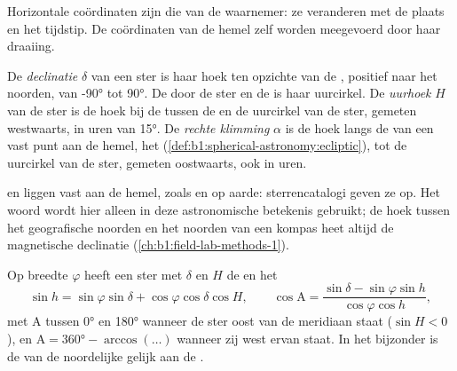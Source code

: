 Horizontale coördinaten zijn die van de waarnemer: ze veranderen met de plaats
en het tijdstip. De coördinaten van de hemel zelf worden meegevoerd door haar
draaiing.

\begin{definition}\label{def:b1:spherical-astronomy:equatorial}
De \emph{declinatie} $\delta$ van een ster is haar
hoek ten opzichte van de , positief naar het noorden, van \ang{-90}
tot \ang{90}. De  door de ster en de  is haar
uurcirkel. De \emph{uurhoek} $H$ van de ster is de hoek bij de
 tussen de  en de uurcirkel van de ster, gemeten
westwaarts, in uren van \ang{15}. De \emph{rechte klimming}
$\alpha$ is de hoek langs de  van een vast punt aan de hemel, het
 (\cref{def:b1:spherical-astronomy:ecliptic}), tot de uurcirkel van de
ster, gemeten oostwaarts, ook in uren.
\end{definition}

 en  liggen vast aan de hemel, zoals  en
 op aarde: sterrencatalogi geven ze op. Het woord  wordt
hier alleen in deze astronomische betekenis gebruikt; de hoek tussen het
geografische noorden en het noorden van een kompas heet altijd de
magnetische declinatie (\cref{ch:b1:field-lab-methods-1}).

\begin{proposition}\label{prop:b1:spherical-astronomy:transform}
Op breedte $\varphi$ heeft een ster met  $\delta$ en  $H$ de
 en het 
\[
  \sin h = \sin\varphi\sin\delta + \cos\varphi\cos\delta\cos H,
  \qquad
  \cos\mathrm{A} = \frac{\sin\delta - \sin\varphi\sin h}{\cos\varphi\cos h},
\]
met $\mathrm{A}$ tussen \ang{0} en \ang{180} wanneer de ster oost van de
meridiaan staat ($\sin H < 0$), en $\mathrm{A} = \ang{360} - \arccos(\dots)$
wanneer zij west ervan staat. In het bijzonder is de  van de noordelijke
 gelijk aan de .
\end{proposition}

